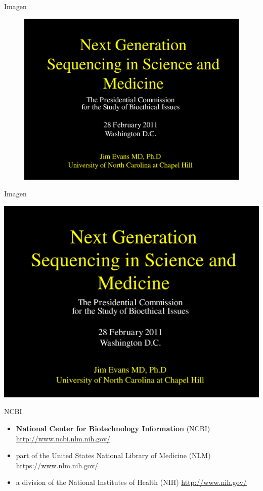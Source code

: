 \begin{frame}{Imagen}

\begin{figure}[htbp]
\centering
\includegraphics{images/foto}
\end{figure}

\end{frame}

\begin{frame}{Imagen}

\includegraphics[scale=.1]{images/foto}

\end{frame}

\begin{frame}{NCBI}

\begin{itemize}
\item
  \textbf{National Center for Biotechnology Information} (NCBI)
  \url{http://www.ncbi.nlm.nih.gov/}
\item
  part of the United States National Library of Medicine (NLM)
  \url{https://www.nlm.nih.gov/}
\item
  a division of the National Institutes of Health (NIH)
  \url{http://www.nih.gov/}
\end{itemize}

\end{frame}

